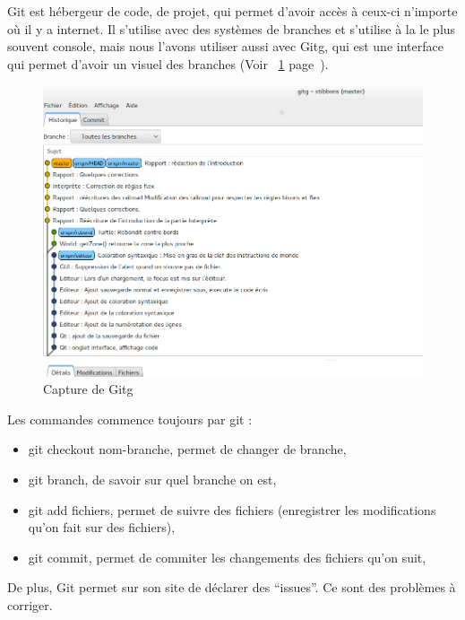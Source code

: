 Git est hébergeur de code, de projet, qui permet d'avoir accès à ceux-ci n'importe où il y a internet.
Il s'utilise avec des systèmes de branches et s'utilise à la le plus souvent console, mais nous l'avons utiliser aussi avec Gitg, qui est une interface qui permet d'avoir un visuel des branches (Voir ~\ref{gitg} page~\pageref{gitg}).


\begin{figure}[h]
\caption{\label{gitg} Capture de Gitg}
\includegraphics[scale=0.35]{doc/report/uml/gitbranche.png}
\end{figure}


Les commandes commence toujours par git :
\begin{itemize}
\item git checkout nom-branche, permet de changer de branche,
\item git branch, de savoir sur quel branche on est,
\item git add fichiers, permet de suivre des fichiers (enregistrer les modifications qu'on fait sur des fichiers),
\item git commit, permet de commiter les changements des fichiers qu'on suit,
\end{itemize}


De plus, Git permet sur son site de déclarer des \enquote{issues}. Ce sont des problèmes à corriger.

